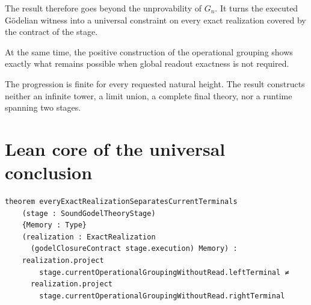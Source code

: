 \documentclass[11pt,a4paper]{article}
\begin{document}
The result therefore goes beyond the unprovability of $G_n$. It turns the
executed Gödelian witness into a universal constraint on every exact
realization covered by the contract of the stage.

At the same time, the positive construction of the operational grouping shows
exactly what remains possible when global readout exactness is not required.

The progression is finite for every requested natural height. The result
constructs neither an infinite tower, a limit union, a complete final theory,
nor a runtime spanning two stages.

\section{Lean core of the universal conclusion}

\small
\begin{verbatim}
theorem everyExactRealizationSeparatesCurrentTerminals
    (stage : SoundGodelTheoryStage)
    {Memory : Type}
    (realization : ExactRealization
      (godelClosureContract stage.execution) Memory) :
    realization.project
        stage.currentOperationalGroupingWithoutRead.leftTerminal ≠
      realization.project
        stage.currentOperationalGroupingWithoutRead.rightTerminal
\end{verbatim}
\normalsize
\end{document}
